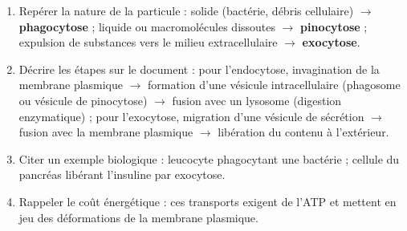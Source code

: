 \documentclass[11pt]{article}
\newcommand{\cle}[1]{{\popxbold\color{popdark}#1}}
\begin{document}
\begin{methode}
\begin{enumerate}
\item \cle{Repérer la nature de la particule} : solide (bactérie, débris cellulaire) $\rightarrow$ \textbf{phagocytose} ; liquide ou macromolécules dissoutes $\rightarrow$ \textbf{pinocytose} ; expulsion de substances vers le milieu extracellulaire $\rightarrow$ \textbf{exocytose}.
\item \cle{Décrire les étapes} sur le document : pour l'endocytose, invagination de la membrane plasmique $\rightarrow$ formation d'une vésicule intracellulaire (phagosome ou vésicule de pinocytose) $\rightarrow$ fusion avec un lysosome (digestion enzymatique) ; pour l'exocytose, migration d'une vésicule de sécrétion $\rightarrow$ fusion avec la membrane plasmique $\rightarrow$ libération du contenu à l'extérieur.
\item \cle{Citer un exemple biologique} : leucocyte phagocytant une bactérie ; cellule du pancréas libérant l'insuline par exocytose.
\item \cle{Rappeler le coût énergétique} : ces transports exigent de l'ATP et mettent en jeu des déformations de la membrane plasmique.
\end{enumerate}
\end{methode}
\end{document}
